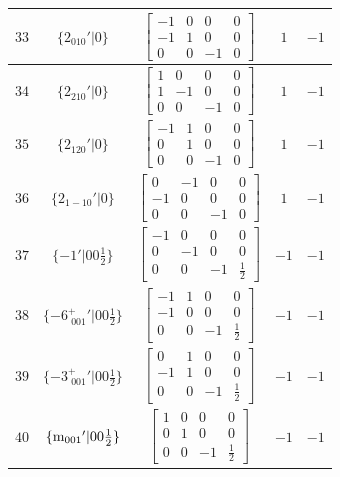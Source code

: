 \documentclass[fleqn,8pt]{jsarticle}
\begin{document}
\begin{longtable}{ccccc}
$ 33 $ & $ \{2{}_{010}{}'|0\} $ & $ \begin{bmatrix} -1 & 0 & 0 & 0 \\ -1 & 1 & 0 & 0 \\ 0 & 0 & -1 & 0 \end{bmatrix} $ & $ 1 $ & $ -1 $ \\ \hline
$ 34 $ & $ \{2{}_{210}{}'|0\} $ & $ \begin{bmatrix} 1 & 0 & 0 & 0 \\ 1 & -1 & 0 & 0 \\ 0 & 0 & -1 & 0 \end{bmatrix} $ & $ 1 $ & $ -1 $ \\ \hline
$ 35 $ & $ \{2{}_{120}{}'|0\} $ & $ \begin{bmatrix} -1 & 1 & 0 & 0 \\ 0 & 1 & 0 & 0 \\ 0 & 0 & -1 & 0 \end{bmatrix} $ & $ 1 $ & $ -1 $ \\ \hline
$ 36 $ & $ \{2{}_{1-10}{}'|0\} $ & $ \begin{bmatrix} 0 & -1 & 0 & 0 \\ -1 & 0 & 0 & 0 \\ 0 & 0 & -1 & 0 \end{bmatrix} $ & $ 1 $ & $ -1 $ \\ \hline
$ 37 $ & $ \{-1{}'|0 0 \frac{1}{2}\} $ & $ \begin{bmatrix} -1 & 0 & 0 & 0 \\ 0 & -1 & 0 & 0 \\ 0 & 0 & -1 & \frac{1}{2} \end{bmatrix} $ & $ -1 $ & $ -1 $ \\ \hline
$ 38 $ & $ \{-6^{+}_{\,\,001}{}'|0 0 \frac{1}{2}\} $ & $ \begin{bmatrix} -1 & 1 & 0 & 0 \\ -1 & 0 & 0 & 0 \\ 0 & 0 & -1 & \frac{1}{2} \end{bmatrix} $ & $ -1 $ & $ -1 $ \\ \hline
$ 39 $ & $ \{-3^{+}_{\,\,001}{}'|0 0 \frac{1}{2}\} $ & $ \begin{bmatrix} 0 & 1 & 0 & 0 \\ -1 & 1 & 0 & 0 \\ 0 & 0 & -1 & \frac{1}{2} \end{bmatrix} $ & $ -1 $ & $ -1 $ \\ \hline
$ 40 $ & $ \{{\rm m}_{001}{}'|0 0 \frac{1}{2}\} $ & $ \begin{bmatrix} 1 & 0 & 0 & 0 \\ 0 & 1 & 0 & 0 \\ 0 & 0 & -1 & \frac{1}{2} \end{bmatrix} $ & $ -1 $ & $ -1 $ \\ \hline

\end{longtable}
\end{document}
